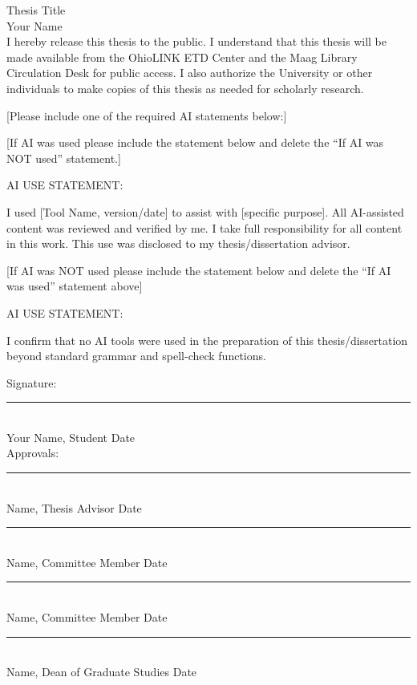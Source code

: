 \thispagestyle{empty} %
\renewcommand{\baselinestretch}{1.0}
Thesis Title \\[0.5 cm] 
Your Name \\[0.5 cm]

I hereby release this thesis to the public.  I understand that this thesis will be made available from the OhioLINK ETD Center and the Maag Library Circulation Desk for public access.  I also authorize the University or other individuals to make copies of this thesis as needed for scholarly research.

[Please include one of the required AI statements below:]

[If AI was used please include the statement below and delete the “If AI was NOT used” statement.]

AI USE STATEMENT:

I used [Tool Name, version/date] to assist with [specific purpose]. All AI-assisted content was reviewed and verified by me. I take full responsibility for all content in this work. This use was disclosed to my thesis/dissertation advisor.

[If AI was NOT used please include the statement below and delete the “If AI was used” statement above]

AI USE STATEMENT:

I confirm that no AI tools were used in the preparation of this thesis/dissertation beyond standard grammar and spell-check functions.


Signature:\\
\noindent\rule{15cm}{0.4pt} \\
\noindent Your Name, Student \hfill Date\\[1cm]
Approvals:\\ 
\noindent\rule{15cm}{0.4pt} \\
\noindent Name, Thesis Advisor \hfill Date\\
\noindent\rule{15cm}{0.4pt}\\
\noindent Name, Committee Member \hfill Date\\
\noindent\rule{15cm}{0.4pt}\\
\noindent Name, Committee Member \hfill Date\\
\noindent\rule{15cm}{0.4pt}\\
\noindent Name, Dean of Graduate Studies \hfill Date
